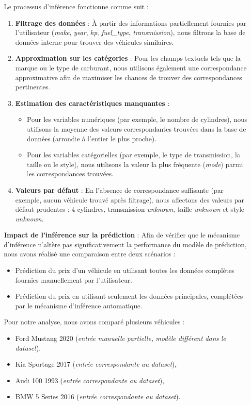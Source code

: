 \documentclass[12pt]{report}
\begin{document}
Le processus d'inférence fonctionne comme suit :
\begin{enumerate}
    \item \textbf{Filtrage des données} : À partir des informations partiellement fournies par l'utilisateur (\textit{make}, \textit{year}, \textit{hp}, \textit{fuel\_type}, \textit{transmission}), nous filtrons la base de données interne pour trouver des véhicules similaires.
    \item \textbf{Approximation sur les catégories} : Pour les champs textuels tels que la marque ou le type de carburant, nous utilisons également une correspondance approximative afin de maximiser les chances de trouver des correspondances pertinentes.
    \item \textbf{Estimation des caractéristiques manquantes} : 
    \begin{itemize}
        \item Pour les variables numériques (par exemple, le nombre de cylindres), nous utilisons la moyenne des valeurs correspondantes trouvées dans la base de données (arrondie à l'entier le plus proche).
        \item Pour les variables catégorielles (par exemple, le type de transmission, la taille ou le style), nous utilisons la valeur la plus fréquente (\textit{mode}) parmi les correspondances trouvées.
    \end{itemize}
    \item \textbf{Valeurs par défaut} : En l'absence de correspondance suffisante (par exemple, aucun véhicule trouvé après filtrage), nous affectons des valeurs par défaut prudentes : \(4\) cylindres, transmission \textit{unknown}, taille \textit{unknown} et style \textit{unknown}.
\end{enumerate}

\textbf{Impact de l'inférence sur la prédiction} :  
Afin de vérifier que le mécanisme d'inférence n'altère pas significativement la performance du modèle de prédiction, nous avons réalisé une comparaison entre deux scénarios :
\begin{itemize}
    \item Prédiction du prix d'un véhicule en utilisant toutes les données complètes fournies manuellement par l'utilisateur.
    \item Prédiction du prix en utilisant seulement les données principales, complétées par le mécanisme d'inférence automatique.
\end{itemize}

Pour notre analyse, nous avons comparé plusieurs véhicules :
\begin{itemize}
    \item Ford Mustang 2020 (\textit{entrée manuelle partielle, modèle différent dans le dataset}),
    \item Kia Sportage 2017 (\textit{entrée correspondante au dataset}),
    \item Audi 100 1993 (\textit{entrée correspondante au dataset}),
    \item BMW 5 Series 2016 (\textit{entrée correspondante au dataset}).
\end{itemize}
\end{document}
